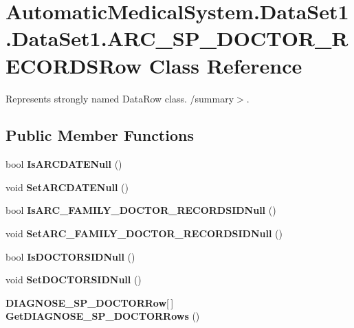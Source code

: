\section{AutomaticMedicalSystem.DataSet1.DataSet1.ARC\_\-SP\_\-DOCTOR\_\-RECORDSRow Class Reference}
\label{class_automatic_medical_system_1_1_data_set1_1_1_a_r_c___s_p___d_o_c_t_o_r___r_e_c_o_r_d_s_row}
Represents strongly named DataRow class. /summary$>$.  


\subsection*{Public Member Functions}
\begin{CompactItemize}
\item 
bool \textbf{IsARCDATENull} ()\label{class_automatic_medical_system_1_1_data_set1_1_1_a_r_c___s_p___d_o_c_t_o_r___r_e_c_o_r_d_s_row_50e440a3b5a8460a14e4339b188bda8b}

\item 
void \textbf{SetARCDATENull} ()\label{class_automatic_medical_system_1_1_data_set1_1_1_a_r_c___s_p___d_o_c_t_o_r___r_e_c_o_r_d_s_row_92c0fa77ca13ce7f555b854bf579c0ab}

\item 
bool \textbf{IsARC\_\-FAMILY\_\-DOCTOR\_\-RECORDSIDNull} ()\label{class_automatic_medical_system_1_1_data_set1_1_1_a_r_c___s_p___d_o_c_t_o_r___r_e_c_o_r_d_s_row_29cc26cacfec47263aaca7a6c418795a}

\item 
void \textbf{SetARC\_\-FAMILY\_\-DOCTOR\_\-RECORDSIDNull} ()\label{class_automatic_medical_system_1_1_data_set1_1_1_a_r_c___s_p___d_o_c_t_o_r___r_e_c_o_r_d_s_row_4d29189856ac3b2a8339ab25250835e8}

\item 
bool \textbf{IsDOCTORSIDNull} ()\label{class_automatic_medical_system_1_1_data_set1_1_1_a_r_c___s_p___d_o_c_t_o_r___r_e_c_o_r_d_s_row_18ed73de7cbc9a735054373558466c84}

\item 
void \textbf{SetDOCTORSIDNull} ()\label{class_automatic_medical_system_1_1_data_set1_1_1_a_r_c___s_p___d_o_c_t_o_r___r_e_c_o_r_d_s_row_519376f530b25aaec708eb7e326991ff}

\item 
{\bf DIAGNOSE\_\-SP\_\-DOCTORRow}[$\,$] \textbf{GetDIAGNOSE\_\-SP\_\-DOCTORRows} ()\label{class_automatic_medical_system_1_1_data_set1_1_1_a_r_c___s_p___d_o_c_t_o_r___r_e_c_o_r_d_s_row_86664899501adf1ce025d29cb39e18e9}

\end{CompactItemize}
